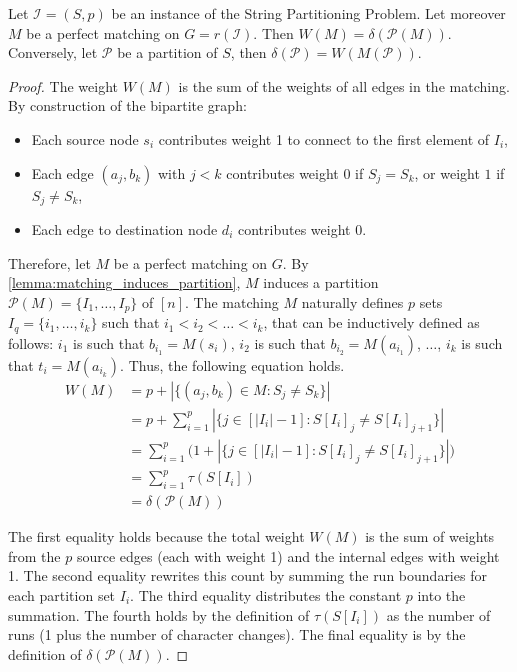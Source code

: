 \begin{lemma} \label{lemma:same_cost}
    Let $\mathcal{I}=(S, p)$ be an instance of the String Partitioning Problem. Let moreover $M$ be a perfect matching on $G = r(\mathcal{I})$. Then $W(M) = \delta(\mathcal{P}(M))$. Conversely, let $\mathcal{P}$ be a partition of $S$, then $\delta(\mathcal{P})=W(M(\mathcal{P}))$.
\end{lemma}
\begin{proof}    
    The weight $W(M)$ is the sum of the weights of all edges in the matching. By construction of the bipartite graph:
    \begin{itemize}
        \item Each source node $s_i$ contributes weight 1 to connect to the first element of $I_i$,
        \item Each edge $(a_j, b_k)$ with $j < k$ contributes weight $0$ if $S_j = S_k$, or weight $1$ if $S_j \neq S_k$,
        \item Each edge to destination node $d_i$ contributes weight $0$.
    \end{itemize}
    
    Therefore, let $M$ be a perfect matching on $G$. By \cref{lemma:matching_induces_partition}, $M$ induces a partition $\mathcal{P}(M) = \{I_1, \ldots, I_p\}$ of $[n]$. The matching $M$ naturally defines $p$ sets $I_q=\{i_1,\dots,i_k\}$ such that $i_1 <i_2<\dots<i_k$, that can be inductively defined as follows: $i_1$ is such that $b_{i_1} = M(s_i)$, $i_2$ is such that $b_{i_2} = M(a_{i_1})$, $\dots$, $i_k$ is such that $t_i = M(a_{i_k})$. Thus, the following equation holds.
    \begin{align*}
        W(M) &= p + |\{(a_j, b_k) \in M:S_j \neq S_k\}| \\
        &= p + \sum_{i=1}^p |\{j \in [|I_i| - 1]:S[I_i]_j \neq S[I_i]_{j+1}\}| \\
        &= \sum_{i=1}^p \big( 1 + |\{j \in [|I_i| - 1]:S[I_i]_j \neq S[I_i]_{j+1}\}| \big) \\
        &= \sum_{i=1}^p \tau(S[I_i]) \\
        &= \delta(\mathcal{P}(M))
    \end{align*}

    The first equality holds because the total weight $W(M)$ is the sum of weights from the $p$ source edges (each with weight 1) and the internal edges with weight 1. The second equality rewrites this count by summing the run boundaries for each partition set $I_i$. The third equality distributes the constant $p$ into the summation. The fourth holds by the definition of $\tau(S[I_i])$ as the number of runs (1 plus the number of character changes). The final equality is by the definition of $\delta(\mathcal{P}(M))$.
    

\end{proof}
